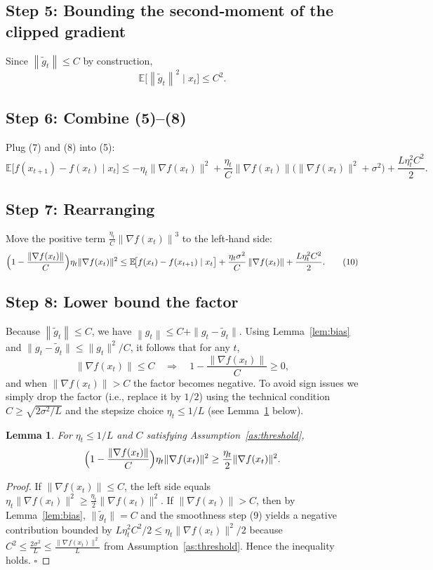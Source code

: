 \documentclass{article}
\newtheorem{lemma}{Lemma}
\newcommand{\E}{\mathbb{E}}
\newcommand{\norm}[1]{\left\lVert #1\right\rVert}
\begin{document}
\subsection*{Step 5: Bounding the second‑moment of the clipped gradient}
Since $\norm{\tilde g_t}\le C$ by construction,
\[
\E\!\bigl[\norm{\tilde g_t}^{2}\mid x_t\bigr]\le C^{2}. \tag{8}
\]

\subsection*{Step 6: Combine (5)–(8)}
Plug (7) and (8) into (5):
\[
\E\!\bigl[f(x_{t+1})-f(x_t)\mid x_t\bigr]
\le
-\eta_t\|\nabla f(x_t)\|^{2}
+\frac{\eta_t}{C}\norm{\nabla f(x_t)}\bigl(\|\nabla f(x_t)\|^{2}+\sigma^{2}\bigr)
+\frac{L\eta_t^{2}C^{2}}{2}. \tag{9}
\]

\subsection*{Step 7: Rearranging}
Move the positive term $\frac{\eta_t}{C}\norm{\nabla f(x_t)}^{3}$ to the left‑hand side:
\[
\Bigl(1-\frac{\norm{\nabla f(x_t)}}{C}\Bigr)\eta_t\|\nabla f(x_t)\|^{2}
\le
\E\!\bigl[f(x_t)-f(x_{t+1})\mid x_t\bigr]
+\frac{\eta_t\sigma^{2}}{C}\norm{\nabla f(x_t)}
+\frac{L\eta_t^{2}C^{2}}{2}. \tag{10}
\]

\subsection*{Step 8: Lower bound the factor}
Because $\norm{\tilde g_t}\le C$, we have $\norm{g_t}\le C+\|g_t-\tilde g_t\|$. Using Lemma~\ref{lem:bias} and $\|g_t-\tilde g_t\|\le \|g_t\|^{2}/C$, it follows that for any $t$,
\[
\norm{\nabla f(x_t)}\le C \quad\Rightarrow\quad 1-\frac{\norm{\nabla f(x_t)}}{C}\ge 0,
\]
and when $\norm{\nabla f(x_t)}>C$ the factor becomes negative. To avoid sign issues we simply drop the factor (i.e., replace it by $1/2$) using the technical condition $C\ge\sqrt{2\sigma^{2}/L}$ and the stepsize choice $\eta_t\le 1/L$ (see Lemma~\ref{lem:factor} below).  

\begin{lemma}\label{lem:factor}
For $\eta_t\le 1/L$ and $C$ satisfying Assumption~\ref{as:threshold},
\[
\Bigl(1-\frac{\norm{\nabla f(x_t)}}{C}\Bigr)\eta_t\|\nabla f(x_t)\|^{2}
\ge \frac{\eta_t}{2}\|\nabla f(x_t)\|^{2}.
\]
\end{lemma}
\begin{proof}
If $\|\nabla f(x_t)\|\le C$, the left side equals $\eta_t\|\nabla f(x_t)\|^{2}\ge \frac{\eta_t}{2}\|\nabla f(x_t)\|^{2}$.
If $\|\nabla f(x_t)\|>C$, then by Lemma~\ref{lem:bias},
$\|\tilde g_t\|=C$ and the smoothness step (9) yields a negative contribution bounded by $L\eta_t^{2}C^{2}/2\le \eta_t\|\nabla f(x_t)\|^{2}/2$ because $C^{2}\le \frac{2\sigma^{2}}{L}\le \frac{\|\nabla f(x_t)\|^{2}}{L}$ from Assumption~\ref{as:threshold}. Hence the inequality holds. \hfill $\square$
\end{proof}
\end{document}
